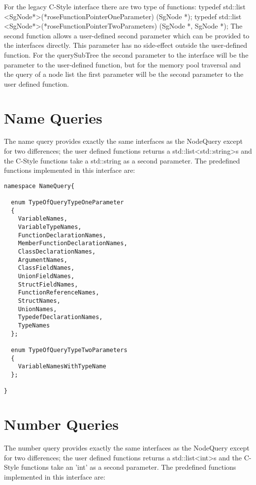 For the legacy C-Style interface there are two type of functions:
  typedef std::list <SgNode*>(*roseFunctionPointerOneParameter) (SgNode *);
  typedef std::list <SgNode*>(*roseFunctionPointerTwoParameters) (SgNode *, SgNode *);
The second function allows a user-defined second parameter which  can be
provided to the interfaces directly. This parameter has no side-effect outside
the user-defined function. For the querySubTree the second parameter to the interface 
will be the parameter to the user-defined function, but for the memory pool
traversal and the query of a node list the first parameter will be the second
parameter to the user defined function.



\section{Name Queries}

The name query provides exactly the same interfaces as the NodeQuery except
for two differences; the user defined functions returns a
std::list<std::string>s and the C-Style functions take a std::string as a
second parameter. The predefined functions implemented in this interface are:

{\mySmallFontSize
\begin{verbatim}
namespace NameQuery{

  enum TypeOfQueryTypeOneParameter
  {
    VariableNames,
    VariableTypeNames,
    FunctionDeclarationNames,
    MemberFunctionDeclarationNames,
    ClassDeclarationNames,
    ArgumentNames,
    ClassFieldNames,
    UnionFieldNames,
    StructFieldNames,
    FunctionReferenceNames,
    StructNames,
    UnionNames,
    TypedefDeclarationNames,
    TypeNames
  };

  enum TypeOfQueryTypeTwoParameters
  {
    VariableNamesWithTypeName
  };

}
\end{verbatim}
}

\section{Number Queries}

The number query provides exactly the same interfaces as the NodeQuery except
for two differences; the user defined functions returns a
std::list<int>s and the C-Style functions take an 'int' as a
second parameter. The predefined functions implemented in this interface are:


